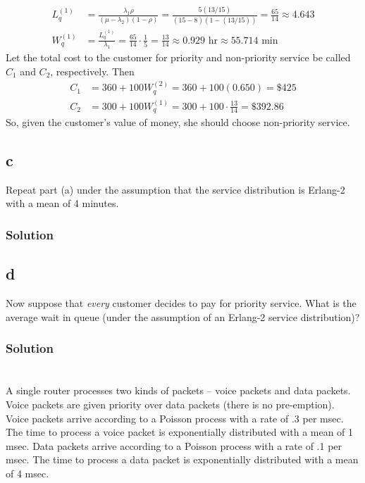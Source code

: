 \documentclass[letterpaper]{amsart}
\begin{document}
\begin{align*}
  L_q^{(1)} &=\frac{\lambda_1\rho}{(\mu-\lambda_2)(1-\rho)}=\frac{5(13/15)}{(15-8)(1-(13/15))}
             = \frac{65}{14} \approx 4.643 \\
  W_q^{(1)} &= \frac{L_q^{(1)}}{\lambda_1} = \frac{65}{14}\cdot\frac{1}{5}
              = \frac{13}{14} \approx 0.929\text{ hr}
              \approx 55.714\text{ min}
\end{align*}
Let the total cost to the customer for priority and non-priority service be called
$C_1$ and $C_2$, respectively. Then
\begin{align*}
  C_1 &= 360 + 100W_q^{(2)}= 360 + 100(0.650) = \$425 \\
  C_2 &= 300 + 100W_q^{(1)}= 300 + 100\cdot\frac{13}{14} = \$392.86
\end{align*}
So, given the customer's value of money, she should choose non-priority service.

\subsection*{c}
Repeat part (a) under the assumption that the service distribution is
Erlang-2 with a mean of 4 minutes.
\subsubsection*{Solution}


\subsection*{d}
Now suppose that \emph{every} customer decides to pay for priority service. What
is the average wait in queue (under the assumption of an Erlang-2 service
distribution)?
\subsubsection*{Solution}

\section{} %
A single router processes two kinds of packets – voice packets and data packets.
Voice packets are given priority over data packets (there is no pre-emption).
Voice packets arrive according to a Poisson process with a rate of .3 per msec.
The time to process a voice packet is exponentially distributed with a mean of 1
msec. Data packets arrive according to a Poisson process with a rate of .1 per
msec. The time to process a data packet is exponentially distributed with a mean
of 4 msec.
\end{document}
